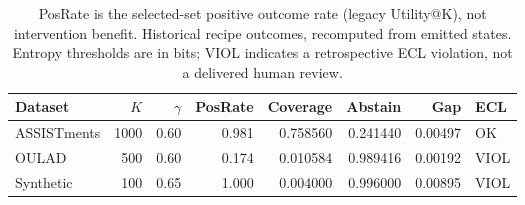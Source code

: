 \begin{table}[t]
\centering
\small
\caption{PosRate is the selected-set positive outcome rate (legacy Utility@K), not intervention benefit. Historical recipe outcomes, recomputed from emitted states. Entropy thresholds are in bits; VIOL indicates a retrospective ECL violation, not a delivered human review.}
\label{tab:run-initial}
\begin{tabular}{lrrrrrrl}
\toprule
Dataset & $K$ & $\gamma$ & PosRate & Coverage & Abstain & Gap & ECL \\
\midrule
ASSISTments & 1000 & 0.60 & 0.981 & 0.758560 & 0.241440 & 0.00497 & OK \\
OULAD & 500 & 0.60 & 0.174 & 0.010584 & 0.989416 & 0.00192 & VIOL \\
Synthetic & 100 & 0.65 & 1.000 & 0.004000 & 0.996000 & 0.00895 & VIOL \\
\bottomrule
\end{tabular}
\end{table}

